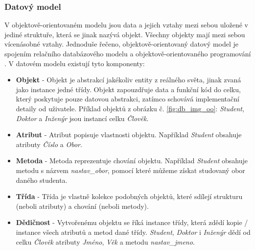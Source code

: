 \subsubsection{Datový model}
V objektově-orientovaném modelu jsou data a jejich vztahy mezi sebou uložené v jediné struktuře, která se jinak nazývá objekt. Všechny objekty mají mezi sebou vícenásobné vztahy. Jednoduše řečeno, objektově-orientovaný datový model je spojením relačního databázového modelu a objektově-orientovaného programování \cite{data_model_oo}.
\newline
\noindent V datovém modelu existují tyto komponenty:
\begin{itemize}
\item \textbf{Objekt} - Objekt je abstrakcí jakékoliv entity z reálného světa, jinak zvaná jako instance jedné třídy. Objekt zapouzdřuje data a funkční kód do celku, který poskytuje pouze datovou abstrakci, zatímco schovává implementační detaily od uživatele. Příklad objektů z obrázku č. \ref{fig:db_img_oo}: \textit{Student}, \textit{Doktor} a \textit{Inženýr} jsou instancí celku \textit{Člověk}.
\item \textbf{Atribut} - Atribut popisuje vlastnosti objektu. Například \textit{Student} obsahuje atributy \textit{Číslo} a \textit{Obor}.
\item \textbf{Metoda} - Metoda reprezentuje chování objektu. Například \textit{Student} obsahuje metodu s názvem \textit{nastav\_obor}, pomocí které můžeme získat studovaný obor daného studenta.
\item \textbf{Třída} - Třída je vlastně kolekce podobných objektů, které sdílejí strukturu (neboli atributy) a chování (neboli metody). 
\item \textbf{Dědičnost} - Vytvořenému objektu se říká instance třídy, která zdědí kopie / instance všech atributů a metod dané třídy. \textit{Student}, \textit{Doktor} i \textit{Inženýr} dědí od celku \textit{Člověk} atributy \textit{Jméno}, \textit{Věk} a metodu \textit{nastav\_jmeno}.
\end{itemize}

